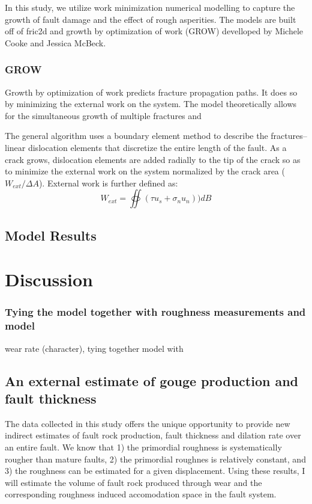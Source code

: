 \documentclass[12pt,a4paper]{article}
\begin{document}
\begin{itemize}
	In this study, we utilize work minimization numerical modelling to capture the growth of fault damage and the effect of rough asperities. The models are built off of fric2d and growth by optimization of work (GROW) develloped by Michele Cooke and Jessica McBeck.
	
		\subsubsection{GROW}
		Growth by optimization of work predicts fracture propagation paths. It does so by minimizing the external work on the system. The model theoretically allows for the simultaneous growth of multiple fractures and 
		
		The general algorithm uses a boundary element method to describe the fractures--linear dislocation elements that discretize the entire length of the fault. As a crack grows, dislocation elements are added radially to the tip of the crack so as to minimize the external work on the system normalized by the crack area ($W_{ext}/\Delta A$). External work is further defined as:
		\begin{equation}
		W_{ext} = \oiint (\tau u_s + \sigma_n u_n))dB
		\end{equation}
		
		
	
	\subsection{Model Results}

\section{Discussion}
	\subsubsection{Tying the model together with roughness measurements and model}
wear rate (character), tying together model with 



	\subsection{An external estimate of gouge production and fault thickness}

The data collected in this study offers the unique opportunity to provide new indirect estimates of fault rock production, fault thickness and dilation rate over an entire fault. We know that 1) the primordial roughness is systematically rougher than mature faults, 2) the primordial roughnes is relatively constant, and 3) the roughness can be estimated for a given displacement. Using these results, I will estimate the volume of fault rock produced through wear and the corresponding roughness induced accomodation space in the fault system.


\end{itemize}
\end{document}
